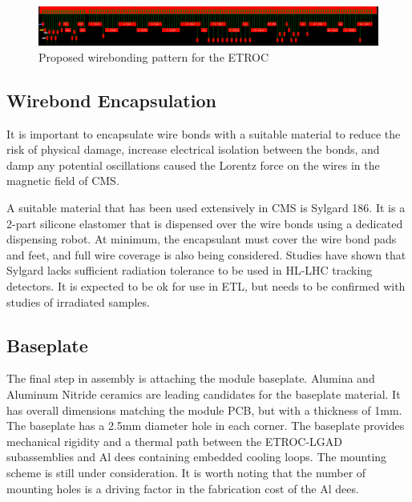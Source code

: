 \documentclass[10pt]{datasheet}
\begin{document}
\begin{figure}[h]
	\centering
	\includegraphics[width=\textwidth]{figures/wirebonding-pattern.png}
	\caption{Proposed wirebonding pattern for the ETROC}
	\label{fig:wirebonding-pattern}	
\end{figure}

\subsection{Wirebond Encapsulation}

It is important to encapsulate wire bonds with a suitable material to reduce the risk of physical damage, increase electrical isolation between the bonds, and damp any potential oscillations caused the Lorentz force on the wires in the magnetic field of CMS.

A suitable material that has been used extensively in CMS is Sylgard 186. It is a 2-part silicone elastomer that is dispensed over the wire bonds using a dedicated dispensing robot. At minimum, the encapsulant must cover the wire bond pads and feet, and full wire coverage is also being considered.  Studies have shown that Sylgard lacks sufficient radiation tolerance to be used in HL-LHC tracking detectors.  It is expected to be ok for use in ETL, but needs to be confirmed with studies of irradiated samples.

\subsection{Baseplate}

The final step in assembly is attaching the module baseplate. Alumina and Aluminum Nitride ceramics are leading candidates for the baseplate material. It has overall dimensions matching the module PCB, but with a thickness of 1mm. The baseplate has a 2.5mm diameter hole in each corner.  The baseplate provides mechanical rigidity and a thermal path between the ETROC-LGAD subassemblies and Al dees containing embedded cooling loops.  The mounting scheme is still under consideration.  It is worth noting that the number of mounting holes is a driving factor in the fabrication cost of the Al dees.
\end{document}
